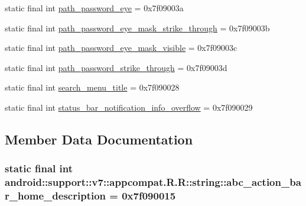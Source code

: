 \begin{CompactItemize}
\item 
static final int \hyperlink{classandroid_1_1support_1_1v7_1_1appcompat_1_1_r_1_1string_4656d39f860097079826dcf2cee6f443}{path\_\-password\_\-eye} = 0x7f09003a
\item 
static final int \hyperlink{classandroid_1_1support_1_1v7_1_1appcompat_1_1_r_1_1string_fc74eb71e3817cad57c42d43225046a2}{path\_\-password\_\-eye\_\-mask\_\-strike\_\-through} = 0x7f09003b
\item 
static final int \hyperlink{classandroid_1_1support_1_1v7_1_1appcompat_1_1_r_1_1string_6410d32d4b4188e16e26f6136bd5269f}{path\_\-password\_\-eye\_\-mask\_\-visible} = 0x7f09003c
\item 
static final int \hyperlink{classandroid_1_1support_1_1v7_1_1appcompat_1_1_r_1_1string_244d83e13c64399b2ac00b3ab7b13be0}{path\_\-password\_\-strike\_\-through} = 0x7f09003d
\item 
static final int \hyperlink{classandroid_1_1support_1_1v7_1_1appcompat_1_1_r_1_1string_1dff3af5a661e1c7c4603a8ce252372d}{search\_\-menu\_\-title} = 0x7f090028
\item 
static final int \hyperlink{classandroid_1_1support_1_1v7_1_1appcompat_1_1_r_1_1string_3b5bdb116442e610ff1360401e17ca4a}{status\_\-bar\_\-notification\_\-info\_\-overflow} = 0x7f090029
\end{CompactItemize}


\subsection{Member Data Documentation}
\hypertarget{classandroid_1_1support_1_1v7_1_1appcompat_1_1_r_1_1string_8a46dbe0db5075d598ea09824e3b9805}{
\subsubsection[{abc\_\-action\_\-bar\_\-home\_\-description}]{\setlength{\rightskip}{0pt plus 5cm}static final int android::support::v7::appcompat.R.R::string::abc\_\-action\_\-bar\_\-home\_\-description = 0x7f090015}}
\label{classandroid_1_1support_1_1v7_1_1appcompat_1_1_r_1_1string_8a46dbe0db5075d598ea09824e3b9805}


